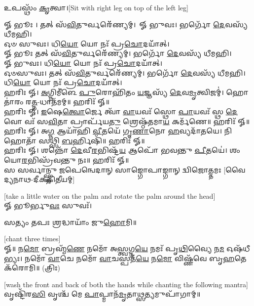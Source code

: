 𑌉𑌪𑌸𑍍𑌥𑌂᳴ \ul{𑌕𑍃}\-𑌤𑍍𑌵𑌾।{\scriptsize [Sit with right leg on top of the left leg]}

𑍐 𑌭𑍂𑌃 । 𑌤𑌤𑍍 𑌸᳴\-\ul{𑌵𑌿}\-𑌤𑍁𑌰𑍍𑌵𑌰𑍇᳴᳴𑌣𑍍𑌯𑌮𑍍।\
𑍐 𑌭𑍁𑌵𑌃। 𑌭𑌰𑍍𑌗𑍋᳴ \ul{𑌦𑍇}\-𑌵𑌸𑍍𑌯᳴ 𑌧𑍀𑌮𑌹𑌿।\\
𑌓𑍞 𑌸𑍁𑌵𑌃। 𑌧𑌿\-\ul{𑌯𑍋} 𑌯𑍋 𑌨𑌃᳴ 𑌪𑍍𑌰\-\ul{𑌚𑍋}\-𑌦𑌯𑌾᳴᳴𑌤𑍍।\\
𑍐 𑌭𑍂𑌃 𑌤𑌤𑍍 𑌸᳴\-\ul{𑌵𑌿}\-𑌤𑍁𑌰𑍍𑌵𑌰𑍇᳴᳴𑌣𑍍𑌯𑌮𑍍। 𑌭𑌰𑍍𑌗𑍋᳴ \ul{𑌦𑍇}\-𑌵𑌸𑍍𑌯᳴ 𑌧𑍀𑌮𑌹𑌿।\\
𑍐 𑌭𑍁𑌵𑌃। 𑌧𑌿\-\ul{𑌯𑍋} 𑌯𑍋 𑌨𑌃᳴ 𑌪𑍍𑌰\-\ul{𑌚𑍋}\-𑌦𑌯𑌾᳴᳴𑌤𑍍।\\
𑌓𑍞𑌸𑍁𑌵𑌃। 𑌤𑌤𑍍 𑌸᳴\-\ul{𑌵𑌿}\-𑌤𑍁𑌰𑍍𑌵𑌰𑍇᳴᳴𑌣𑍍𑌯𑌮𑍍। 𑌭𑌰𑍍𑌗𑍋᳴ \ul{𑌦𑍇}\-𑌵𑌸𑍍𑌯᳴ 𑌧𑍀𑌮𑌹𑌿। 𑌧𑌿\-\ul{𑌯𑍋} 𑌯𑍋 𑌨𑌃᳴ 𑌪𑍍𑌰\-\ul{𑌚𑍋}\-𑌦𑌯𑌾᳴᳴𑌤𑍍।\\

𑌹𑌰𑌿𑌃 𑍐। \ul{𑌅}\-𑌗𑍍𑌨𑌿𑌮𑍀॑𑌳𑍇 \ul{𑌪𑍁}\-𑌰𑍋𑌹𑌿᳴𑌤𑌂 \ul{𑌯}\-𑌜𑍍𑌞𑌸𑍍𑌯᳴ \ul{𑌦𑍇}\-𑌵\-\ul{𑌮𑍃}\-𑌤𑍍𑌵𑌿𑌜𑌮𑍍॑। 𑌹𑍋𑌤𑌾॑𑌰𑌂 𑌰\-\ul{𑌤𑍍𑌨}\--𑌧𑌾𑌤᳴𑌮𑌮𑍍॥ 𑌹𑌰𑌿𑌃᳴ 𑍐॥\\

𑌹𑌰𑌿𑌃 𑍐। \ul{𑌇}\-𑌷𑍇\-\ul{𑌤𑍍𑌵𑍋}\-𑌰𑍍𑌜𑍇 𑌤𑍍𑌵𑌾᳴ \ul{𑌵𑌾}\-𑌯𑌵𑌃᳴ 𑌸𑍍𑌥𑍋 \ul{𑌪𑌾}\-𑌯𑌵𑌃᳴ 𑌸𑍍𑌥 \ul{𑌦𑍇}\-𑌵𑍋 𑌵𑌃᳴ 𑌸\-\ul{𑌵𑌿}\-𑌤𑌾 𑌪𑍍𑌰𑌾𑌰𑍍𑌪᳴𑌯\-\ul{𑌤𑍁} 𑌶𑍍𑌰𑍇𑌷𑍍𑌠᳴𑌤𑌮𑌾\-\ul{𑌯} 𑌕𑌰𑍍𑌮᳴𑌣𑍇॥ 𑌹𑌰𑌿𑌃᳴ 𑍐॥ \\

𑌹𑌰𑌿𑌃 𑍐। 𑌅\-\ul{𑌗𑍍𑌨} 𑌆𑌯𑌾᳴𑌹𑌿 \ul{𑌵𑍀}\-𑌤𑌯𑍇᳴ 𑌗𑍃\-\ul{𑌣𑌾}\-𑌨𑍋 \ul{𑌹}\-𑌵𑍍𑌯𑌦𑌾᳴𑌤𑌯𑍇। 𑌨𑌿 𑌹𑍋𑌤𑌾᳴ 𑌸𑌥𑍍𑌸𑌿 \ul{𑌬}\-𑌰𑍍𑌹𑌿𑌷𑌿᳴॥ 𑌹𑌰𑌿𑌃᳴ 𑍐॥\\

𑌹𑌰𑌿𑌃 𑍐। 𑌶𑌨𑍍𑌨𑍋᳴ \ul{𑌦𑍇}\-𑌵𑍀\-\ul{𑌰}\-𑌭𑌿𑌷𑍍𑌟᳴\-\ul{𑌯} 𑌆𑌪𑍋᳴ 𑌭𑌵𑌨𑍍𑌤𑍁 \ul{𑌪𑍀}\-𑌤𑌯𑍇॑। 𑌶𑌂 𑌯𑍋\-\ul{𑌰}\-𑌭𑌿𑌸𑍍𑌰᳴𑌵𑌨𑍍𑌤𑍁 𑌨𑌃॥ 𑌹𑌰𑌿𑌃᳴ 𑍐॥\\

{\centering
{}
{𑌸 𑌸𑌰𑍍𑌵𑌾𑌨𑍍𑌸𑍍𑌤𑍁 𑌜𑌪𑍇𑌨𑍍𑌵𑍇𑌦𑌾𑌨𑍍 𑌸𑌾𑌙𑍍𑌗𑍋𑌪𑌾𑌙𑍍𑌗𑌾𑌨𑍍 𑌦𑍍𑌵𑌿𑌜𑍋𑌤𑍍𑌤𑌮𑌃}
}
{\hfill [𑌵𑍈𑌦𑍍𑌯𑌨𑌾𑌥-𑌦𑍀𑌕𑍍𑌷𑌿𑌤𑍀𑌯𑌮𑍍]}

{\scriptsize [take a little water on the palm and rotate the palm around the head]}\\
𑍐 𑌭𑍂𑌰𑍍𑌭𑍁\-\ul{𑌵𑌃} 𑌸𑍁𑌵𑌃᳴।

𑌸𑌤𑍍𑌯𑌂 𑌤𑌪𑌃 𑌶𑍍𑌰𑌦𑍍𑌧𑌾𑌯𑌾𑌂᳴ 𑌜𑍁\-\ul{𑌹𑍋}\-𑌮𑌿॥


{\scriptsize [chant three times]}\\

𑍐॥ 𑌨\-\ul{𑌮𑍋} 𑌬𑍍𑌰𑌹𑍍𑌮᳴\-\ul{𑌣𑍇} 𑌨𑌮𑍋᳴ 𑌅\-\ul{𑌸𑍍𑌤𑍍𑌵}\-𑌗𑍍𑌨\-\ul{𑌯𑍇} 𑌨𑌮𑌃᳴ 𑌪𑍃\-\ul{𑌥𑌿}\-𑌵𑍍𑌯𑍈 𑌨\-\ul{𑌮} 𑌓𑌷᳴𑌧𑍀𑌭𑍍𑌯𑌃।
𑌨𑌮𑍋᳴ \ul{𑌵𑌾}\-𑌚𑍇 𑌨𑌮𑍋᳴ \ul{𑌵𑌾}\-𑌚𑌸𑍍𑌪𑌤᳴\-\ul{𑌯𑍇} 𑌨\-\ul{𑌮𑍋} 𑌵𑌿𑌷𑍍𑌣᳴𑌵𑍇 𑌬𑍃\-\ul{𑌹}\-𑌤𑍇 𑌕᳴𑌰𑍋𑌮𑌿॥ (𑌤𑍍𑌰𑌿𑌃)

{\scriptsize [wash the front and back of both the hands while chanting the following mantra]}\\
𑌵𑍃𑌷𑍍𑌟𑌿᳴𑌰\-\ul{𑌸𑌿} 𑌵𑍃𑌶𑍍𑌚᳴ 𑌮𑍇 \ul{𑌪𑌾}\-𑌪𑍍𑌮𑌾𑌨᳴\-\ul{𑌮𑍃}\-𑌤𑌾\-\ul{𑌥𑍍𑌸}\-𑌤𑍍𑌯𑌮𑍁𑌪𑌾᳴𑌗𑌾𑌮𑍍॥


